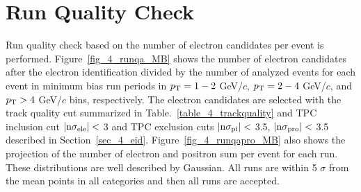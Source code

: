 




\section{Run Quality Check}
\label{sec_4_runselection}
Run quality check based on the number of electron candidates per event is performed. 
Figure~\ref{fig_4_runqa_MB} shows the number of electron candidates after the electron identification divided by the number of analyzed events for each event in minimum bias run periods in $p_{\rm{T}}=1-2$ GeV/$c$, $p_{\rm{T}}=2-4$ GeV/$c$, and $p_{\rm{T}}>4$ GeV/$c$ bins, respectively. 
The electron candidates are selected with the track quality cut summarized in Table.~\ref{table_4_trackquality} and TPC inclusion cut $|\rm{n}\sigma_{ele}| < $ 3 and TPC exclusion cuts $|\rm{n}\sigma_{pi}| < $ 3.5, $|\rm{n}\sigma_{pro}| < $ 3.5 described in Section~\ref{sec_4_eid}.
Figure~\ref{fig_4_runqapro_MB} also shows the projection of the number of electron and positron sum per event for each run. 
These distributions are well described by Gaussian.
All runs are within 5 $\sigma$ from the mean points in all categories and then all runs are accepted.  

